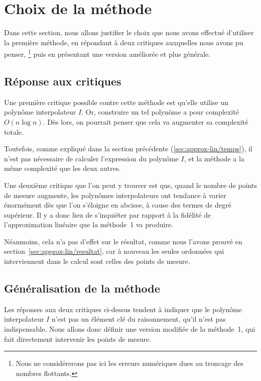 \section{Choix de la méthode}

Dans cette section, nous allons justifier
le choix que nous avons effectué d'utiliser la première méthode,
en répondant à deux critiques auxquelles nous avons pu penser,%
\footnote{
    Nous ne considérerons pas ici les erreurs numériques
    dues au troncage des nombres flottants.
}
puis en présentant une version améliorée et plus générale.

\subsection{Réponse aux critiques}

Une première critique possible contre cette méthode
est qu'elle utilise un polynôme interpolateur $I$.
Or, construire un tel polynôme a pour complexité $O(n\log n)$.
\cite{lagrange-complexity}
Dès lors, on pourrait penser que cela va augmenter sa complexité totale.

Toutefois, comme expliqué dans la section précédente
(\ref{sec:approx-lin/temps}),
il n'est pas nécessaire de calculer l'expression du polynôme $I$,
et la méthode a la même complexité que les deux autres.

Une deuxième critique que l'on peut y trouver est que,
quand le nombre de points de mesure augmente,
les polynômes interpolateurs ont tendance à varier énormément
dès que l'on s'éloigne en abcisse,
à cause des termes de degré supérieur.
Il y a donc lieu de s'inquiéter par rapport à la fidélité
de l'approximation linéaire que la méthode~1 va produire.

Néanmoins, cela n'a pas d'effet sur le résultat, comme nous l'avons
prouvé en section~\ref{sec:approx-lin/resultat},
car à nouveau les seules ordonnées qui interviennent dans le calcul
sont celles des points de mesure.

\subsection{Généralisation de la méthode}

Les réponses aux deux critiques ci-dessus tendent à indiquer
que le polynôme interpolateur $I$ n'est pas un élément clé du raisonnement,
qu'il n'est pas indispensable.
Nous allons donc définir une version modifiée de la méthode~1,
qui fait directement intervenir les points de mesure.

